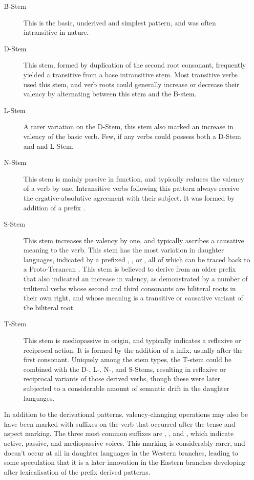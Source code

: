 \documentclass[grammar]{subfiles}
\begin{document}
\begin{description}
  \item[B-Stem] This is the basic, underived and simplest pattern, and was
    often intransitive in nature.
  \item[D-Stem] This stem, formed by duplication of the second root consonant,
    frequently yielded a transitive from a base intransitive stem.  Most
    transitive verbs used this stem, and verb roots could generally increase or
    decrease their valency by alternating between this stem and the B-stem.
  \item[L-Stem] A rarer variation on the D-Stem, this stem also marked an increase 
    in valency of the basic verb.  Few, if any verbs could possess both a D-Stem and
    and L-Stem.
  \item[N-Stem] This stem is mainly passive in function, and typically reduces
    the valency of a verb by one.  Intransitive verbs following this pattern
    always receive the ergative-absolutive agreement with their subject.  It
    was formed by addition of a prefix .
  \item[S-Stem] This stem increases the valency by one, and typically ascribes
    a causative meaning to the verb.  This stem has the most variation in
    daughter languages, indicated by a prefixed , ,  or
    , all of which can be traced back to a Proto-Teranean .  This
    stem is believed to derive from an older prefix that also indicated an
    increase in valency, as demonstrated by a number of triliteral verbs whose
    second and third consonants are biliteral roots in their own right, and
    whose meaning is a transitive or causative variant of the biliteral root.
  \item[T-Stem] This stem is mediopassive in origin, and typically indicates a
    reflexive or reciprocal action.  It is formed by the addition of a 
    infix, usually after the first consonant.  Uniquely among the stem types,
    the T-stem could be combined with the D-, L-, N-, and S-Stems, resulting in
    reflexive or reciprocal variants of those derived verbs, though these were
    later subjected to a considerable amount of semantic drift in the daughter
    languages.
\end{description}

In addition to the derivational patterns, valency-changing operations may also be
have been marked with suffixes on the verb that occurred after the tense and
aspect marking.  The three most common suffixes are , , and ,
which indicate active, passive, and mediopassive voices.  This marking is
considerably rarer, and doesn't occur at all in daughter languages in the
Western branches, leading to some speculation that it is a later innovation in
the Eastern branches developing after lexicalisation of the prefix derived patterns.
\end{document}
